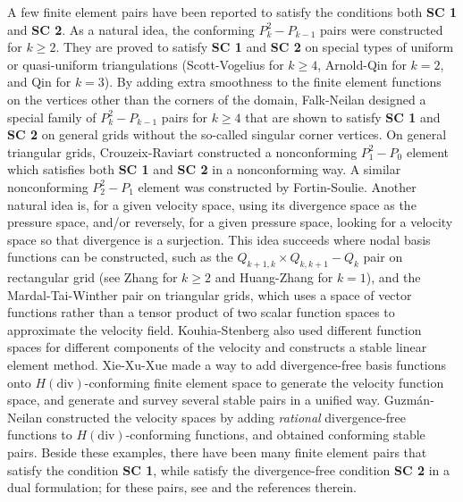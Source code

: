 \documentclass[12pt,showkeys]{amsart}
\begin{document}
A few finite element pairs have been reported to satisfy the conditions both \textbf{SC 1} and \textbf{SC 2}. As a natural idea, the conforming $P_k^2-P_{k-1}$ pairs were constructed for $k\geqslant2$. They are proved to satisfy \textbf{SC 1} and \textbf{SC 2} on special types of uniform or quasi-uniform triangulations (Scott-Vogelius\cite{Scott.L;Vogelius.M1985,Scott.L;Vogelius.M1985LAM} for $k\geqslant 4$, Arnold-Qin\cite{Arnold.D;Qin.J1992} for $k=2$, and Qin \cite{Qin.J1994} for $k=3$). By adding extra smoothness to the finite element functions on the vertices other than the corners of the domain, Falk-Neilan \cite{Falk.R;Neilan.M2013} designed a special family of $P_k^2-P_{k-1}$ pairs for $k\geqslant 4$ that are shown to satisfy \textbf{SC 1} and \textbf{SC 2} on general grids without the so-called singular corner vertices. On general triangular grids, Crouzeix-Raviart \cite{Crouzeix.M;Raviart.P1973} constructed a nonconforming $P_1^2-P_0$ element which satisfies both \textbf{SC 1} and \textbf{SC 2} in a nonconforming way. A similar nonconforming $P_2^2-P_1$ element was constructed by Fortin-Soulie\cite{Fortin.M;Soulie.M1983}. Another natural idea is, for a given velocity space, using its divergence space as the pressure space, and/or reversely, for a given pressure space, looking for a velocity space so that divergence is a surjection. This idea succeeds where nodal basis functions can be constructed, such as the $Q_{k+1,k}\times  Q_{k,k+1}-Q_{k}$ pair on rectangular grid (see Zhang \cite{Zhang.S2009} for $k\geqslant 2$ and Huang-Zhang \cite{Huang.Y;Zhang.S2011} for $k=1$), and the Mardal-Tai-Winther pair\cite{Mardal.K;Tai.X;Winther.R2002} on triangular grids, which uses a space of vector functions rather than a tensor product of two scalar function spaces to approximate the velocity field. Kouhia-Stenberg \cite{Kouhia.K;Stenberg.R1995} also used different function spaces for different components of the velocity and constructs a stable linear element method. Xie-Xu-Xue\cite{Xie.X;Xu.J;Xue.G2008} made a way to add divergence-free basis functions onto $H(\mathrm{div})$-conforming finite element space to generate the velocity function space, and generate and survey several stable pairs in a unified way. Guzm\'an-Neilan \cite{Guzman.J;Neilan.M} constructed the velocity spaces by adding \emph{rational} divergence-free functions to $H(\mathrm{div})$-conforming functions, and obtained conforming stable pairs. Beside these examples, there have been many finite element pairs that satisfy the condition \textbf{SC 1}, while satisfy the divergence-free condition \textbf{SC 2} in a dual formulation; for these pairs, see \cite{Boffi.D;Brezzi.F;Fortin.M2008,Brezzi.F;Fortin.M1991,Girault.V;Raviart.P,Rannacher.R2000} and the references therein. 
\end{document}
